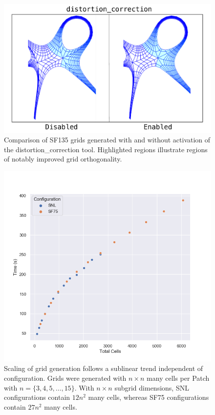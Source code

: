 \begin{figure}[H]
    \centering
    \includegraphics[width=\linewidth]{figures/distortion_correction_1.pdf}
    \caption{Comparison of SF135 grids generated with and without activation of the distortion\_correction tool. Highlighted regions illustrate regions of notably improved grid orthogonality.}
    \label{fig:distortion_correction}
\end{figure}

\begin{figure}[H]
    \centering
    \includegraphics[width=\linewidth]{figures/benchmark/benchmark_grid_scaling.png}
    \caption{Scaling of grid generation follows a sublinear trend independent of configuration. Grids were generated with $n\times n$ many cells per Patch with $n = \{3, 4, 5, \dots, 15\}$. With $n \times n$ subgrid dimensions, SNL configurations contain $12n^2$ many cells, whereas SF75 configurations contain $27n^2$ many cells.}
    \label{fig:benchmark_grid_scaling}
\end{figure}

